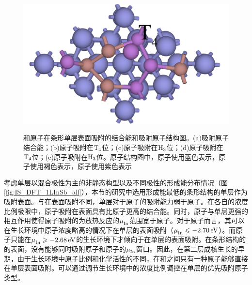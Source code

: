 \begin{figure}
{        \includegraphics[scale=0.9]{pic/IS_structure_2Linsb_adatoms_SbT4.png}
    }
    \caption{和原子在条形单层表面吸附的结合能和吸附原子结构图。(a)吸附原子结合能；(b)原子吸附在$\rm T_{4} \it$位；(c)原子吸附在$\rm H_{3} \it$位；(d)原子吸附在$\rm T_{4} \it$位；(e)原子吸附在$\rm H_{3} \it$位。原子结构图中，原子使用蓝色表示，原子使用褐色表示，原子使用紫色表示}
    \label{fig:IS_2Linsb_adatom}
\end{figure}

考虑单层以混合极性为主的非静态构型以及不同极性的形成能分布情况（图\ref{fig:IS_DFT_1LInSb_all}），本节的研究中选用形成能最低的条形结构的单层作为吸附表面。与在表面吸附不同，单层对于原子的吸附能力弱于原子。在各自的浓度比例极限中，原子吸附在表面具有比原子更高的结合能。同时，原子与单层更强的相互作用使得原子吸附的为放热反应的$\it \mu_{\rm In}^{\rm } \it$范围宽于原子。对于原子而言，其可以在生长环境中原子浓度略高的情况下在单层的表面吸附（$\it \mu_{\rm In}^{\rm } \it\leqslant \SI{-2.70}{\electronvolt}$）。而原子只能在$\it \mu_{\rm In}^{\rm } \it \geqslant \SI{-2.68}{\electronvolt}$的生长环境下才倾向于在单层的表面吸附。在条形结构的的表面，没有能够同时吸附原子和原子的$\it \mu_{\rm In}^{\rm } \it$窗口。因此，在第二层成核生长的早期，由于生长环境中原子比例和化学活性的不同，在和之间只有一种原子能够直接在单层表面吸附。可以通过调节生长环境中的浓度比例调控在单层的优先吸附原子类型。

